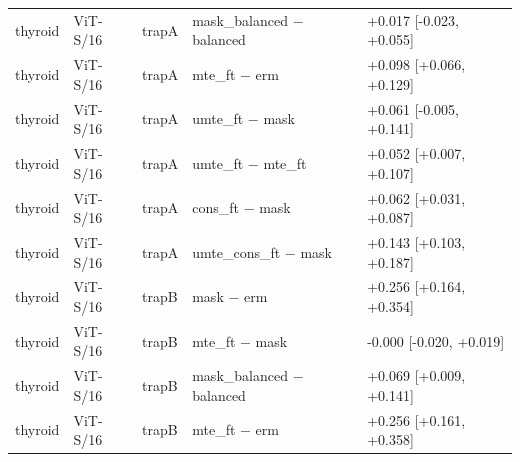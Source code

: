 \begin{table}[H]
\begin{tabular}{lllll}
thyroid & ViT-S/16 & trapA & mask\_balanced $-$ balanced & +0.017 [-0.023, +0.055] \\
thyroid & ViT-S/16 & trapA & mte\_ft $-$ erm & +0.098 [+0.066, +0.129] \\
thyroid & ViT-S/16 & trapA & umte\_ft $-$ mask & +0.061 [-0.005, +0.141] \\
thyroid & ViT-S/16 & trapA & umte\_ft $-$ mte\_ft & +0.052 [+0.007, +0.107] \\
thyroid & ViT-S/16 & trapA & cons\_ft $-$ mask & +0.062 [+0.031, +0.087] \\
thyroid & ViT-S/16 & trapA & umte\_cons\_ft $-$ mask & +0.143 [+0.103, +0.187] \\
thyroid & ViT-S/16 & trapB & mask $-$ erm & +0.256 [+0.164, +0.354] \\
thyroid & ViT-S/16 & trapB & mte\_ft $-$ mask & -0.000 [-0.020, +0.019] \\
thyroid & ViT-S/16 & trapB & mask\_balanced $-$ balanced & +0.069 [+0.009, +0.141] \\
thyroid & ViT-S/16 & trapB & mte\_ft $-$ erm & +0.256 [+0.161, +0.358] \\
\bottomrule\end{tabular}\end{table}
